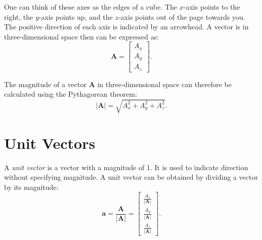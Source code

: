 \documentclass[12pt]{article}
\begin{document}
One can think of these axes as the edges of a cube. The \(x\)-axis points to the right, the \(y\)-axis points up, and the \(z\)-axis points out of the page towards you. The positive direction of each axis is indicated by an arrowhead. A vector is in three-dimensional space then can be expressed as:
\[
\mathbf{A} = \begin{bmatrix} A_x \\ A_y \\ A_z \end{bmatrix}.
\]

\begin{center}
\end{center}

The magnitude of a vector \(\mathbf{A}\) in three-dimensional space can therefore be calculated using the Pythagorean theorem:
\[
|\mathbf{A}| = \sqrt{A_x^2 + A_y^2 + A_z^2}.
\]


\section{Unit Vectors}
A \emph{unit vector} is a vector with a magnitude of 1. It is used to indicate direction without specifying magnitude. A unit vector can be obtained by dividing a vector by its magnitude:
\[
\mathbf{a} = \frac{\mathbf{A}}{|\mathbf{A}|} = \begin{bmatrix} \frac{A_x}{|\mathbf{A}|} \\ \frac{A_y}{|\mathbf{A}|}  \\ \frac{A_z}{|\mathbf{A}|}  \end{bmatrix}.
\]
\end{document}
